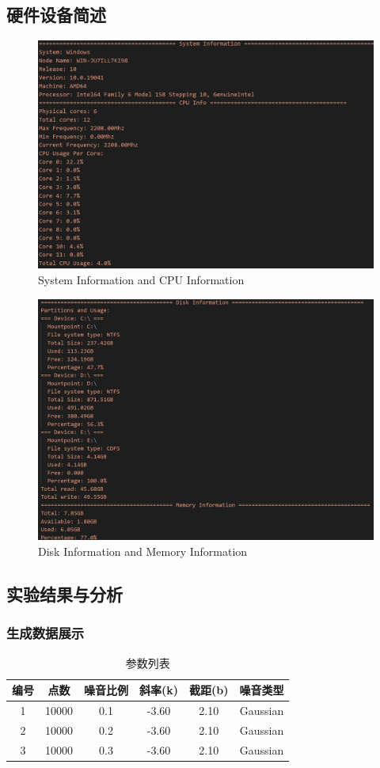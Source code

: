 \documentclass{seuer}
\begin{document}
\subsection{硬件设备简述}
\begin{figure}[H]
  \centering
  \includegraphics[width=0.8\linewidth]{./image/Info1.png}
  \caption{System Information and CPU Information} \label{fig:eg}
\end{figure}
\begin{figure}[H]
  \centering
  \includegraphics[width=0.8\linewidth]{./image/Info2.png}
  \caption{Disk Information and Memory Information} \label{fig:eg}
\end{figure}



\subsection{实验结果与分析}
\subsubsection{生成数据展示}
\begin{table}[h]
  \centering
  \captionnamefont{\wuhao\bf\heiti}
  \captiontitlefont{\wuhao\bf\heiti}
  \caption{参数列表} \label{tab:eg1}
  \liuhao
  \begin{tabular}{cccccc}
  \toprule
  {编号} &  {点数} & {噪音比例} & {斜率(k)} & {截距(b)} & {噪音类型}\\
  \midrule 
  1 & 10000 & 0.1 & -3.60 & 2.10 & Gaussian  \\
  2 & 10000 & 0.2 & -3.60 & 2.10 & Gaussian  \\
  3 & 10000 & 0.3 & -3.60 & 2.10 & Gaussian  \\
  \bottomrule
  \end{tabular}
\end{table}
\end{document}
